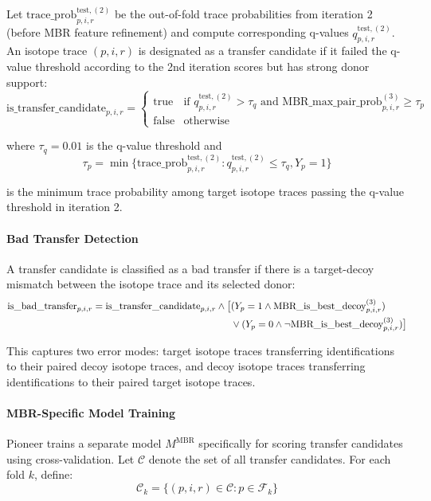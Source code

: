 \documentclass[pdflatex,sn-nature]{sn-jnl}
\begin{document}
Let $\text{trace\_prob}_{p,i,r}^{\text{test},(2)}$ be the out-of-fold trace probabilities from iteration 2 (before MBR feature refinement) and compute corresponding q-values $q_{p,i,r}^{\text{test},(2)}$. An isotope trace $(p,i,r)$ is designated as a transfer candidate if it failed the q-value threshold according to the 2nd iteration scores but has strong donor support:
\begin{equation}
  \text{is\_transfer\_candidate}_{p,i,r} = \begin{cases}
      \text{true} & \text{if } q_{p,i,r}^{\text{test},(2)} > \tau_q \text{ and } \text{MBR\_max\_pair\_prob}_{p,i,r}^{(3)} \geq \tau_p \\
      \text{false} & \text{otherwise}
  \end{cases}
\end{equation}

where $\tau_q = 0.01$ is the q-value threshold and 
\[
\tau_p = \min\{\text{trace\_prob}_{p,i,r}^{\text{test},(2)} : q_{p,i,r}^{\text{test},(2)} \leq \tau_q, Y_p = 1\}
\]

is the minimum trace probability among target isotope traces passing the q-value threshold in iteration 2.


\paragraph{Bad Transfer Detection}\label{para:bad-transfer-detection} A transfer candidate is classified as a bad transfer if there is a target-decoy mismatch between the isotope trace and its selected donor:
\begin{align}
  \text{is\_bad\_transfer}_{p,i,r} = \text{is\_transfer\_candidate}_{p,i,r} \land \big[&(Y_p = 1 \land \text{MBR\_is\_best\_decoy}_{p,i,r}^{(3)}) \notag \\
  &\lor (Y_p = 0 \land \lnot\text{MBR\_is\_best\_decoy}_{p,i,r}^{(3)})\big]
\end{align}

This captures two error modes: target isotope traces transferring identifications to their paired decoy isotope traces, and decoy isotope traces transferring identifications to their paired target isotope traces.


\paragraph{MBR-Specific Model Training}\label{para:mbr-specific-model-training} 
Pioneer trains a separate model $M^{\text{MBR}}$ specifically for scoring transfer candidates using cross-validation. Let $\mathcal{C}$ denote the set of all transfer candidates. For each fold $k$, define:
\begin{equation}
  \mathcal{C}_k = \{(p,i,r) \in \mathcal{C} : p \in \mathcal{F}_k\}
\end{equation}
\end{document}
